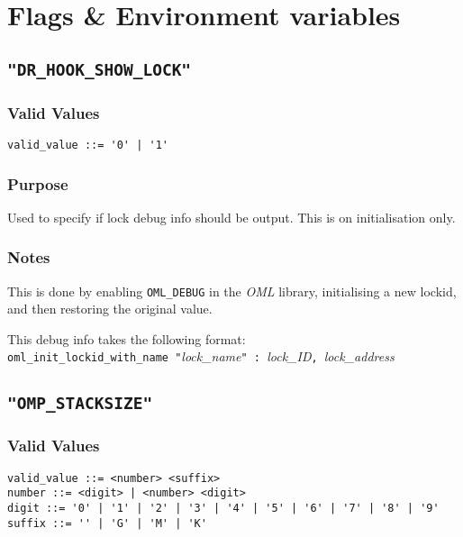 \section{Flags \& Environment variables}

\subsection{\texttt{"DR\_HOOK\_SHOW\_LOCK"}}
\label{section:flags:DR_HOOK_SHOW_LOCK}
\vspace{-2ex}
\subsubsection{Valid Values}
\vspace{-2ex}
\verb+valid_value ::= '0' | '1'+ \hfill 

\vspace{-2ex}
\subsubsection{Purpose}
\vspace{-2ex}
Used to specify if lock debug info should be output. This is on initialisation only.

\vspace{-2ex}
\subsubsection{Notes}
\vspace{-2ex}
This is done by enabling \texttt{OML\_DEBUG} in the \textit{OML} library, initialising a new lockid, and then restoring the original value.

This debug info takes the following format:\\
\verb|oml_init_lockid_with_name "|\textit{lock\_name}\verb|" : |\textit{lock\_ID}\verb|, |\textit{lock\_address}



\subsection{\texttt{"OMP\_STACKSIZE"}}
\label{section:flags:OMP_STACKSIZE}
\vspace{-2ex}
\subsubsection{Valid Values}
\vspace{-2ex}
\verb+valid_value ::= <number> <suffix>+ \\
\verb+number ::= <digit> | <number> <digit>+ \\
\verb+digit ::= '0' | '1' | '2' | '3' | '4' | '5' | '6' | '7' | '8' | '9'+\\
\verb+suffix ::= '' | 'G' | 'M' | 'K'+

